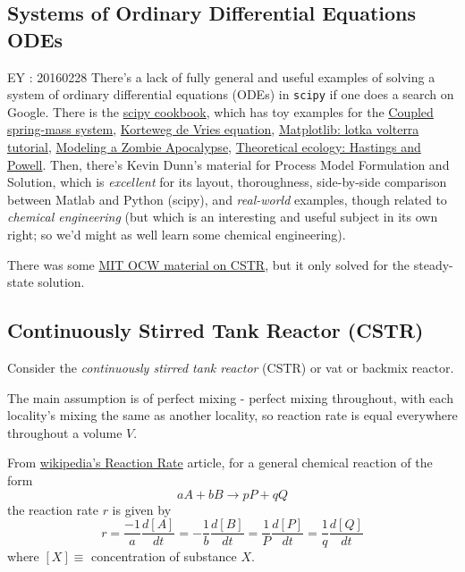 \documentclass[10pt]{amsart}
\begin{document}
\begin{multicols*}{2}
\section{Systems of Ordinary Differential Equations ODEs}

EY : 20160228 There's a lack of fully general and useful examples of solving a system of ordinary differential equations (ODEs) in \verb|scipy| if one does a search on Google.  There is the \href{http://scipy-cookbook.readthedocs.org/items/numpy_scipy_ordinary_differential_equations.html}{scipy cookbook}, which has toy examples for the \href{http://scipy-cookbook.readthedocs.org/items/CoupledSpringMassSystem.html}{Coupled spring-mass system}, \href{http://scipy-cookbook.readthedocs.org/items/KdV.html}{Korteweg de Vries equation}, \href{http://scipy-cookbook.readthedocs.org/items/LoktaVolterraTutorial.html}{Matplotlib: lotka volterra tutorial}, \href{http://scipy-cookbook.readthedocs.org/items/Zombie_Apocalypse_ODEINT.html}{Modeling a Zombie Apocalypse}, \href{http://scipy-cookbook.readthedocs.org/items/Theoretical_Ecology_Hastings_and_Powell.html}{Theoretical ecology: Hastings and Powell}.  Then, there's Kevin Dunn's material for Process Model Formulation and Solution, which is \emph{excellent} for its layout, thoroughness, side-by-side comparison between Matlab and Python (scipy), and \emph{real-world} examples, though related to \emph{chemical engineering} (but which is an interesting and useful subject in its own right; so we'd might as well learn some chemical engineering).    

There was some \href{http://ocw.mit.edu/courses/chemical-engineering/10-37-chemical-and-biological-reaction-engineering-spring-2007/lecture-notes/lec05_02212007_g.pdf}{MIT OCW material on CSTR}, but it only solved for the steady-state solution.  

\subsection{Continuously Stirred Tank Reactor (CSTR)}

Consider the \emph{continuously stirred tank reactor} (CSTR) or vat or backmix reactor.  

The main assumption is of perfect mixing - perfect mixing throughout, with each locality's mixing the same as another locality, so reaction rate is equal everywhere throughout a volume $V$.  

From \href{https://en.wikipedia.org/wiki/Reaction_rate}{wikipedia's Reaction Rate} article, for a general chemical reaction of the form
\[
aA + bB \to pP + qQ
\]
the reaction rate $r$ is given by 
\[
r = \frac{-1}{a} \frac{d[A]}{dt} = - \frac{1}{b} \frac{d[B]}{dt} = \frac{1}{P} \frac{d[P]}{dt} = \frac{1}{q} \frac{d[Q]}{dt}
\]
where $[X] \equiv $ concentration of substance $X$.  


\end{multicols*}
\end{document}
